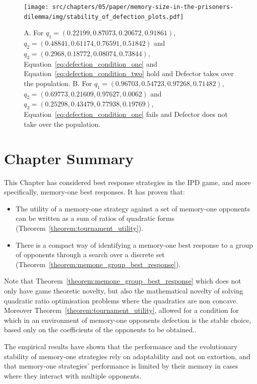 \begin{figure}[!htbp]
    \centering
    \texttt{[image: src/chapters/05/paper/memory-size-in-the-prisoners-dilemma/img/stability\_of\_defection\_plots.pdf]}
    \caption{A. For \(q_{1}=(0.22199, 0.87073, 0.20672, 0.91861)\),
    $q_{2}=(0.48841, 0.61174, 0.76591, 0.51842)$ and
    $q_{3}=(0.2968, 0.18772, 0.08074, 0.73844)$, Equation~\ref{eq:defection_condition_one} and
    Equation~\ref{eq:defection_condition_two} hold and Defector takes over the
    population. B. For $q_{1}=(0.96703, 0.54723, 0.97268, 0.71482)$,
    $q_{2}=(0.69773, 0.21609, 0.97627, 0.0062)$ and
    $q_{3}=(0.25298, 0.43479, 0.77938, 0.19769)$, Equation~\ref{eq:defection_condition_one} fails
    and Defector does not take over the population.}\label{fig:stability_of_defection}
\end{figure}

\section{Chapter Summary}

This Chapter has considered best response strategies in the IPD
game, and more specifically, memory-one best responses. It has proven that:

\begin{itemize}
    \item The utility of a memory-one strategy against a set
          of memory-one opponents can be written as a sum of ratios of quadratic
          forms (Theorem~\ref{theorem:tournament_utility}).
    \item There is a compact way of identifying a memory-one best response to a
        group of opponents through a search over a discrete set
        (Theorem~\ref{theorem:memone_group_best_response}).
\end{itemize}

Note that Theorem~\ref{theorem:memone_group_best_response} which does not only
have game theoretic novelty, but also the mathematical novelty of solving
quadratic ratio optimisation problems where the quadratics are non concave.
Moreover Theorem~\ref{theorem:tournament_utility}, allowed for a
condition for which in an environment of memory-one opponents defection is the
stable choice, based only on the coefficients of the opponents to be obtained..

The empirical results have shown that the performance and the evolutionary
stability of memory-one strategies rely on adaptability and not on extortion,
and that memory-one strategies' performance is limited by their memory in cases
where they interact with multiple opponents.

